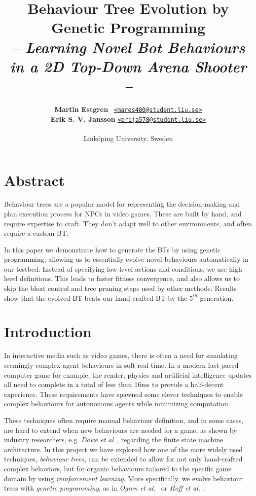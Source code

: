 \documentclass[a4paper, twocolumn]{article}
\title{\textbf{Behaviour Tree Evolution by Genetic Programming}\\
       \Large{\emph{-- Learning Novel Bot Behaviours in a 2D Top-Down Arena Shooter --}}}
\author{{\textbf{Martin Estgren}} \;\;\;\;\;\;\;\;\;\, {\href{mailto:mares480@student.liu.se}
                                                       {\texttt{<mares480@student.liu.se>}}} \\
        {\textbf{Erik S. V. Jansson}} \;\;\;\;         {\href{mailto:erija578@student.liu.se}
                                                       {\texttt{<erija578@student.liu.se>}}} \\~\\
        {Linköping University, Sweden}\vspace{-2.0ex}}
\begin{document}
    \maketitle
    \section*{Abstract}

    Behaviour trees are a popular model for representing the decision-making and plan execution process for NPCs in video games. These are built by hand, and require expertise to craft. They don't adapt well to other environments, and often require a custom BT.

    In this paper we demonstrate how to generate the BTs by using genetic programming; allowing us to essentially evolve novel behaviours automatically in our testbed. Instead of specifying low-level actions and conditions, we use high-level definitions. This leads to faster fitness convergence, and also allows us to skip the bloat control and tree pruning steps used by other methods. Results show that the evolved BT beats our hand-crafted BT by the \(5^{th}\) generation. \footnotemark[1]

    \vspace{1.0em}

    \begingroup
    \def\addvspace#1{}
    \tableofcontents
    \endgroup
    \newpage

    \newpage %
    \nocite{*} %
    
    
    \thispagestyle{empty}
    \clearpage
    \addtocounter{page}{-1}

    \section{Introduction} \label{sec:introduction}

    In interactive media such as video games, there is often a need for simulating seemingly complex agent behaviours in soft real-time. In a modern fast-paced computer game for example, the render, physics and artificial intelligence updates all need to complete in a total of less than 16ms to provide a half-decent experience. These requirements have spawned some clever techniques to enable complex behaviours for autonomous agents while minimizing computation.

    These techniques often require manual behaviour definition, and in some cases, are hard to extend when new behaviours are needed for a game, as shown by industry researchers, e.g. \emph{Dawe et al}~\cite{dawe2014overview}, regarding the finite state machine architecture. In this project we have explored how one of the more widely used techniques, \emph{behaviour trees}, can be extended to allow for not only hand-crafted complex behaviors, but for organic behaviours tailored to the specific game domain by using \emph{reinforcement learning}. More specifically, we evolve behaviour trees with \emph{genetic programming}, as in \emph{{\"O}gren et al.}~\cite{colledanchise2015learning} or \emph{Hoff et al.}~\cite{hoff2016evolving}.
\end{document}
